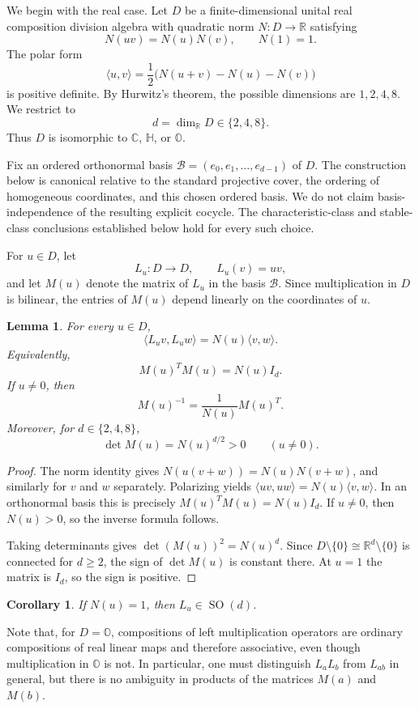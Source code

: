 \documentclass[12pt]{article}
\theoremstyle{plain}
\newtheorem{lemma}[theorem]{Lemma}
\newtheorem{corollary}[theorem]{Corollary}
\theoremstyle{definition}
\newcommand{\R}{\mathbb R}
\newcommand{\C}{\mathbb C}
\newcommand{\Hh}{\mathbb H}
\newcommand{\Oct}{\mathbb O}
\newcommand{\SO}{\operatorname{SO}}
\begin{document}
We begin with the real case. Let $D$ be a finite-dimensional unital
real composition division algebra with quadratic norm $N:D\longrightarrow\R$
satisfying
\[
N(uv)=N(u)N(v),\qquad N(1)=1.
\]
The polar form
\[
\langle u,v\rangle
=\frac12\bigl(N(u+v)-N(u)-N(v)\bigr)
\]
is positive definite. By Hurwitz's theorem, the possible dimensions
are $1,2,4,8$. We restrict to
\[
d=\dim_\R D\in\{2,4,8\}.
\]
Thus $D$ is isomorphic to $\C$, $\Hh$, or $\Oct$.

Fix an ordered orthonormal basis $\mathcal B=(e_0,e_1,\ldots,e_{d-1})$ of $D$. The construction below is canonical relative to the standard
projective cover, the ordering of homogeneous coordinates, and this
chosen ordered basis. We do not claim basis-independence of the
resulting explicit cocycle. The characteristic-class and stable-class
conclusions established below hold for every such choice.

For $u\in D$, let
\[
L_u:D\longrightarrow D,
\qquad L_u(v)=uv,
\]
and let $M(u)$ denote the matrix of $L_u$ in the basis $\mathcal B$.
Since multiplication in $D$ is bilinear, the entries of $M(u)$ depend
linearly on the coordinates of $u$.

\begin{lemma}
	\label{lem:similarity}
	For every $u\in D$,
	\[
	\langle L_u v,L_u w\rangle
	=N(u)\langle v,w\rangle.
	\]
	Equivalently,
	\[
	M(u)^T M(u)=N(u)I_d.
	\]
	If $u\ne0$, then
	\[
	M(u)^{-1}=\frac{1}{N(u)}M(u)^T.
	\]
	Moreover, for $d\in\{2,4,8\}$,
	\[
	\det M(u)=N(u)^{d/2}>0
	\qquad (u\ne0).
	\]
\end{lemma}

\begin{proof}
	The norm identity gives $N(u(v+w))=N(u)N(v+w)$, and similarly for $v$ and $w$ separately. Polarizing yields $	\langle uv,uw\rangle=N(u)\langle v,w\rangle$. In an orthonormal basis this is precisely $M(u)^TM(u)=N(u)I_d$. If $u\ne0$, then $N(u)>0$, so the inverse formula
	follows.
	
	Taking determinants gives $\det(M(u))^2=N(u)^d$. Since $D\setminus\{0\}\cong\R^d\setminus\{0\}$ is connected for
	$d\ge2$, the sign of $\det M(u)$ is constant there. At $u=1$ the
	matrix is $I_d$, so the sign is positive.
\end{proof}

\begin{corollary}
	\label{cor:unit-orthogonal}
	If $N(u)=1$, then $L_u\in\SO(d)$.
\end{corollary}


Note that, for $D=\Oct$, compositions of left multiplication operators are
ordinary compositions of real linear maps and therefore associative,
even though multiplication in $\Oct$ is not. In particular, one must
distinguish $L_aL_b$ from $L_{ab}$ in general, but there is no ambiguity in products of the matrices $M(a)$ and $M(b)$.
\end{document}
